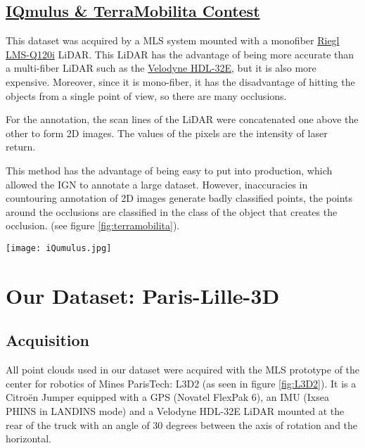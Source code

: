 \documentclass[a4paper, 10pt, journal]{article}
\begin{document}
\subsection{\href{http://data.ign.fr/benchmarks/UrbanAnalysis/}{IQmulus \& TerraMobilita Contest} \cite{vallet2015terramobilita}}\label{subsec:iqmulus}
This dataset was acquired by a MLS system mounted with a monofiber \href{http://www.riegl.com/nc/products/industrial-scanning/produktdetail/product/scanner/10/}{Riegl LMS-Q120i} LiDAR. This LiDAR has the advantage of being more accurate than a multi-fiber LiDAR such as the \href{http://velodynelidar.com/hdl-32e.html}{Velodyne HDL-32E}, but it is also more expensive. Moreover, since it is mono-fiber, it has the disadvantage of hitting the objects from a single point of view, so there are many occlusions.

For the annotation, the scan lines of the LiDAR were concatenated one above the other to form 2D images. The values of the pixels are the intensity of laser return.

This method has the advantage of being easy to put into production, which allowed the IGN to annotate a large dataset. However, inaccuracies in countouring annotation of 2D images generate badly classified points, the points around the occlusions are classified in the class of the object that creates the occlusion.
(see figure \ref{fig:terramobilita}).

\begin{center}\centering
 \texttt{[image: iQumulus.jpg]}
\end{center}

\section{Our Dataset: Paris-Lille-3D} \label{sec:ourDataset}

\subsection{Acquisition} \label{subsec:acquisition}
All point clouds used in our dataset were acquired with the MLS prototype of the center for robotics of Mines ParisTech: L3D2 \cite{goulette2006integrated} (as seen in figure \ref{fig:L3D2}). It is a Citro\"en Jumper equipped with a GPS (Novatel FlexPak 6), an IMU (Ixsea PHINS in LANDINS mode) and a Velodyne HDL-32E LiDAR mounted at the rear of the truck with an angle of 30 degrees between the axis of rotation and the horizontal.
\end{document}
